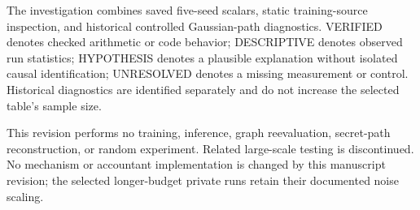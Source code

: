The investigation combines saved five-seed scalars, static training-source inspection, and historical controlled Gaussian-path diagnostics. VERIFIED denotes checked arithmetic or code behavior; DESCRIPTIVE denotes observed run statistics; HYPOTHESIS denotes a plausible explanation without isolated causal identification; UNRESOLVED denotes a missing measurement or control. Historical diagnostics are identified separately and do not increase the selected table's sample size.

This revision performs no training, inference, graph reevaluation, secret-path reconstruction, or random experiment. Related large-scale testing is discontinued. No mechanism or accountant implementation is changed by this manuscript revision; the selected longer-budget private runs retain their documented noise scaling.
